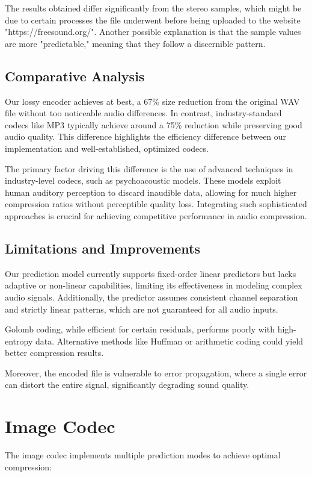 \documentclass[a4paper,14pt]{article}
\begin{document}
The results obtained differ significantly from the stereo samples, which might be due to certain processes the file underwent before being uploaded to the website "https://freesound.org/". Another possible explanation is that the sample values are more "predictable," meaning that they follow a discernible pattern.


\subsection{Comparative Analysis}
Our lossy encoder achieves at best, a 67\% size reduction from the original WAV file without too noticeable audio differences. In contrast, industry-standard codecs like MP3 typically achieve around a 75\% reduction while preserving good audio quality. This difference highlights the efficiency difference between our implementation and well-established, optimized codecs. 

The primary factor driving this difference is the use of advanced techniques in industry-level codecs, such as psychoacoustic models. These models exploit human auditory perception to discard inaudible data, allowing for much higher compression ratios without perceptible quality loss. Integrating such sophisticated approaches is crucial for achieving competitive performance in audio compression.



\subsection{Limitations and Improvements}
Our prediction model currently supports fixed-order linear predictors but lacks adaptive or non-linear capabilities, limiting its effectiveness in modeling complex audio signals. Additionally, the predictor assumes consistent channel separation and strictly linear patterns, which are not guaranteed for all audio inputs.

Golomb coding, while efficient for certain residuals, performs poorly with high-entropy data. Alternative methods like Huffman or arithmetic coding could yield better compression results.

Moreover, the encoded file is vulnerable to error propagation, where a single error can distort the entire signal, significantly degrading sound quality.


\section{Image Codec}
The image codec implements multiple prediction modes to achieve optimal compression:
\end{document}
